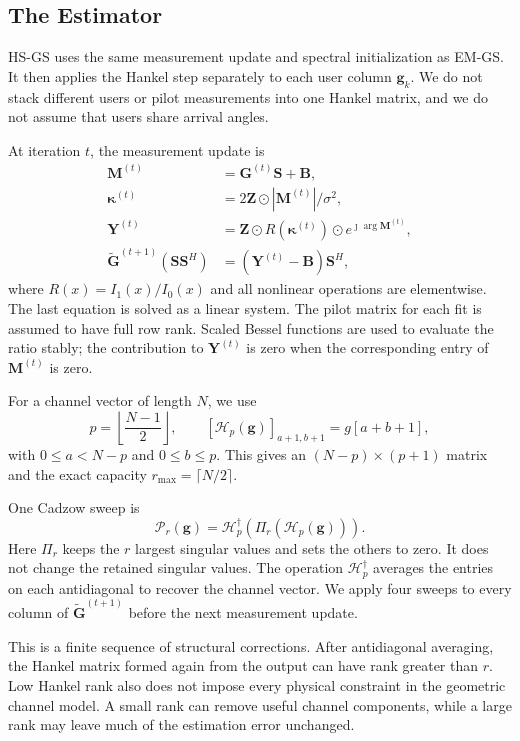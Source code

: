 \subsection{The Estimator}
\label{sec:revised-estimator}

HS-GS uses the same measurement update and spectral initialization as
EM-GS. It then applies the Hankel step separately to each user column
$\mathbf g_k$. We do not stack different users or pilot measurements into
one Hankel matrix, and we do not assume that users share arrival angles.

At iteration $t$, the measurement update is
\begin{align}
\mathbf M^{(t)}&=\mathbf G^{(t)}\mathbf S+\mathbf B,\\
\boldsymbol\kappa^{(t)}&=
  2\mathbf Z\odot|\mathbf M^{(t)}|/\sigma^2,\\
\mathbf Y^{(t)}&=\mathbf Z\odot R(\boldsymbol\kappa^{(t)})
  \odot e^{\jmath\arg\mathbf M^{(t)}},\\
\widetilde{\mathbf G}^{(t+1)}(\mathbf S\mathbf S^H)
  &=(\mathbf Y^{(t)}-\mathbf B)\mathbf S^H,
\label{eq:revision-em-update}
\end{align}
where $R(x)=I_1(x)/I_0(x)$ and all nonlinear operations are elementwise.
The last equation is solved as a linear system. The pilot matrix for each
fit is assumed to have full row rank. Scaled Bessel functions are used to
evaluate the ratio stably; the contribution to $\mathbf Y^{(t)}$ is zero
when the corresponding entry of $\mathbf M^{(t)}$ is zero.

For a channel vector of length $N$, we use
\begin{equation}
p=\left\lfloor\frac{N-1}{2}\right\rfloor,
\qquad
[\mathcal H_p(\mathbf g)]_{a+1,b+1}=g[a+b+1],
\end{equation}
with $0\leq a<N-p$ and $0\leq b\leq p$. This gives an
$(N-p)\times(p+1)$ matrix and the exact capacity
$r_{\max}=\lceil N/2\rceil$.

One Cadzow sweep is
\begin{equation}
\mathcal P_r(\mathbf g)=
\mathcal H_p^\dagger\!\left(\Pi_r(\mathcal H_p(\mathbf g))\right).
\label{eq:revision-cadzow}
\end{equation}
Here $\Pi_r$ keeps the $r$ largest singular values and sets the others to
zero. It does not change the retained singular values. The operation
$\mathcal H_p^\dagger$ averages the entries on each antidiagonal to recover
the channel vector. We apply four sweeps to every column of
$\widetilde{\mathbf G}^{(t+1)}$ before the next measurement update.

This is a finite sequence of structural corrections. After antidiagonal
averaging, the Hankel matrix formed again from the output can have rank
greater than $r$. Low Hankel rank also does not impose every physical
constraint in the geometric channel model. A small rank can remove useful
channel components, while a large rank may leave much of the estimation
error unchanged.
